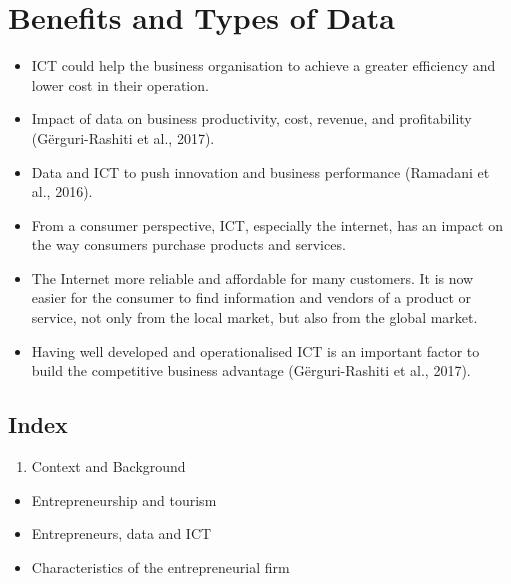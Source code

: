 \documentclass[
  letterpaper,
  DIV=11,
  numbers=noendperiod]{scrreprt}
\providecommand{\tightlist}{%
  \setlength{\itemsep}{0pt}\setlength{\parskip}{0pt}}\usepackage{longtable,booktabs,array}
\begin{document}
\hypertarget{benefits-and-types-of-data}{%
\section*{Benefits and Types of Data}\label{benefits-and-types-of-data}}


\begin{itemize}
\tightlist
\item
  ICT could help the business organisation to achieve a greater
  efficiency and lower cost in their operation.
\item
  Impact of data on business productivity, cost, revenue, and
  profitability (Gërguri-Rashiti et al., 2017).
\item
  Data and ICT to push innovation and business performance (Ramadani et
  al., 2016).
\item
  From a consumer perspective, ICT, especially the internet, has an
  impact on the way consumers purchase products and services.
\item
  The Internet more reliable and affordable for many customers. It is
  now easier for the consumer to find information and vendors of a
  product or service, not only from the local market, but also from the
  global market.
\item
  Having well developed and operationalised ICT is an important factor
  to build the competitive business advantage (Gërguri-Rashiti et al.,
  2017).
\end{itemize}

\hypertarget{index}{%
\subsection*{Index}\label{index}}

\begin{enumerate}
\def\labelenumi{\arabic{enumi}.}
\tightlist
\item
  Context and Background
\end{enumerate}

\begin{itemize}
\tightlist
\item
  Entrepreneurship and tourism
\item
  Entrepreneurs, data and ICT
\item
  Characteristics of the entrepreneurial firm
\end{itemize}
\end{document}
